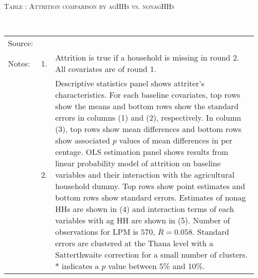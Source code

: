 \begin{minipage}[t]{14cm}
\hfil\textsc{\normalsize Table \thetable: Attrition comparison by agHHs vs. nonagHHs\label{tab attrition comparison}}\\
\setlength{\tabcolsep}{1pt}
\renewcommand{\arraystretch}{.8}
\hfil{}\\
\renewcommand{\arraystretch}{.8}
\setlength{\tabcolsep}{1pt}
\begin{tabular}{>{\hfill\scriptsize}p{1cm}<{}>{\hfill\scriptsize}p{.25cm}<{}>{\scriptsize}p{12.5cm}<{\hfill}}
Source:& \multicolumn{2}{l}{\scriptsize Compiled from IFPRI data.}\\
Notes: & 1. & Attrition is true if a household is missing in round 2. All covariates are of round 1.\\
& 2. & \textsf{Descriptive statistics} panel shows attriter's characteristics. For each baseline covariates, top rows show the means and bottom rows show the standard errors in columns (1) and (2), respectively. In column (3), top rows show mean differences and bottom rows show associated $p$ values of mean differences in per centage. \textsf{OLS estimation} panel shows results from linear probability model of attrition on baseline variables and their interaction with the agricultural household dummy. Top rows show point estimates and bottom rows show standard errors. Estimates of nonag HHs are shown in (4) and interaction terms of each variables with ag HH are shown in (5). Number of observations for LPM is $570$, $\bar{R}=0.058$. Standard errors are clustered at the Thana level with a Satterthwaite correction for a small number of clusters. $*$ indicates a $p$ value between 5\% and 10\%. 
\end{tabular}
\end{minipage}

